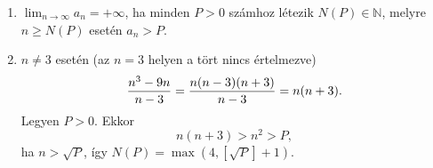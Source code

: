\documentclass[11pt]{scrartcl}
\begin{document}
\begin{enumerate}
	\item $\lim_{n \to \infty} a_n = +\infty$, ha minden $P > 0$ számhoz
	      létezik $N(P) \in \mathbb{N}$, melyre $n \ge N(P)$ esetén $a_n > P$.

	\item $n \ne 3$ esetén (az $n = 3$ helyen a tört nincs értelmezve)
	      \[
		      \frac{n^3 - 9n}{n - 3}
		      = \frac{n (n - 3)(n + 3)}{n - 3}
		      = n (n + 3)
		      \text.
	      \]
	      Legyen $P > 0$. Ekkor
	      \[
		      n (n + 3) > n^2 > P,
	      \]
	      ha $n > \sqrt{P}$, így
	      \(
	      N(P) = \max\left( 4, \left[ \sqrt{P} \right] + 1 \right)
	      \).
\end{enumerate}
\end{document}
